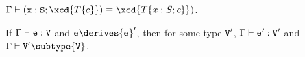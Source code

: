 % 
% 
% 
% 
% 

\begin{lemma}\label{existslemma}
$\Gamma \vdash ({\tt x}: {\tt S}; \xcd{T\{c\}}) \equiv \xcd{T\{x: S; c\}})$.
\end{lemma}


\begin{theorem} 
\label{preservation}
If $\Gamma \vdash {\tt e}: {\tt V}$ and ${\tt e} \derives {\tt e}'$, then for some type ${\tt V}'$,
$\Gamma \vdash {\tt e}': {\tt V}'$ and $\Gamma \vdash {\tt V}' \subtype {\tt V}$.
\end{theorem}

